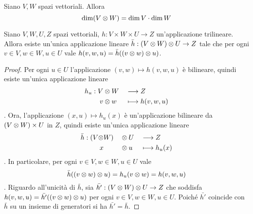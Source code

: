 \begin{corollary}
Siano $V\comma W$ spazi vettoriali. Allora
$$
\dim (V\otimes W)=\dim V\cdot\dim W
$$
\end{corollary}

\begin{proposition}
Siano $V\comma W\comma U\comma Z$ spazi vettoriali, $h:V\times W\times U\to Z$ un'applicazione trilineare. Allora esiste un'unica applicazione lineare $\bar h:(V\otimes W)\otimes U\to Z$ tale che per ogni $v\in V,w\in W,u\in U$ vale $h(v,w,u)=\bar h((v\otimes w)\otimes u)$.
\end{proposition}
\begin{proof}
Per ogni $u\in U$ l'applicazione $(v,w)\mapsto h(v,w,u)$ è bilineare, quindi esiste un'unica applicazione lineare
\begin{alignat*}{2}
h_u:V&\otimes W&&\longrightarrow Z\\
v&\otimes w&&\longmapsto h(v,w,u)
\end{alignat*}
. Ora, l'applicazione $(x,u)\mapsto h_u(x)$ è un'applicazione bilineare da $(V\otimes W)\times U$ in $Z$, quindi esiste un'unica applicazione lineare
\begin{alignat*}{3}
\bar h:(V\otimes& W)&&\otimes U&&\longrightarrow Z\\
x&&&\otimes u&&\longmapsto h_u(x)
\end{alignat*}
. In particolare, per ogni $v\in V,w\in W,u\in U$ vale
$$
\bar h((v\otimes w)\otimes u)=h_u(v\otimes w)=h(v,w,u)
$$
. Riguardo all'unicità di $\bar h$, sia $\bar{h'}:(V\otimes W)\otimes U\to Z$ che soddisfa $h(v,w,u)=\bar{h'}((v\otimes w)\otimes u)$ per ogni $v\in V,w\in W,u\in U$. Poiché $\bar{h'}$ coincide con $\bar h$ su un insieme di generatori si ha $\bar{h'}=\bar h$.
\end{proof}

